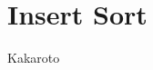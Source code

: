 \documentclass[knowledge.tex]{subfiles}
\begin{document}
    \section{Insert Sort}
    Kakaroto
\end{document}
